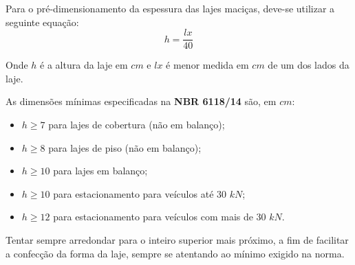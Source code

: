 Para o pré-dimensionamento da espessura das lajes maciças, deve-se utilizar a seguinte equação: $$h=\frac{lx}{40}$$ 

Onde $h$ é a altura da laje em $cm$ e $lx$ é menor medida em $cm$ de um dos lados da laje.

As dimensões mínimas especificadas na \textbf{NBR 6118/14} são, em $cm$:

\begin{itemize}
	\item $h \geqslant 7$ para lajes de cobertura (não em balanço);
	\item $h \geqslant 8$ para lajes de piso (não em balanço);
	\item $h \geqslant 10$ para lajes em balanço;
	\item $h \geqslant 10$ para estacionamento para veículos até 30 $kN$;
	\item $h \geqslant 12$ para estacionamento para veículos com mais de 30 $kN$.
\end{itemize}

Tentar sempre arredondar para o inteiro superior mais próximo, a fim de facilitar a confecção da forma da laje, sempre se atentando ao mínimo exigido na norma.